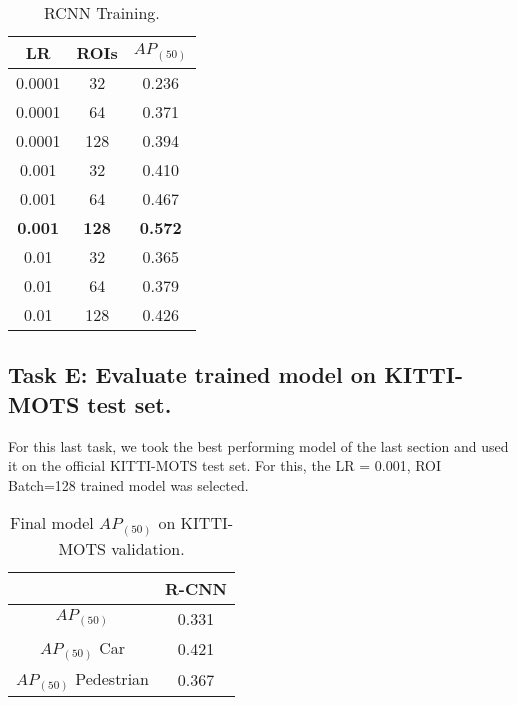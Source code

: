 \documentclass[12pt,a4paper,twocolumn,twoside]{article}
\begin{document}
\begin{table}[ht]
    \centering
    \begin{tabular}{|c | c || c|} 
        \hline
        \textbf{LR} & \textbf{ROIs} & \textbf{$AP_{(50)}$} \\ [0.8ex] 
            \hline
            0.0001 & 32 & 0.236 \\ 
            \hline
            0.0001 & 64 & 0.371\\ 
            \hline
            0.0001 & 128 & 0.394 \\ 
            \hline
            0.001 & 32 & 0.410\\ 
            \hline
            0.001 & 64 & 0.467\\ 
            \hline
            \textbf{0.001} & \textbf{128} & \textbf{0.572}\\ 
            \hline
            0.01 & 32 & 0.365\\ 
            \hline
            0.01 & 64 & 0.379\\ 
            \hline
            0.01 & 128 & 0.426\\ 
         \hline
    \end{tabular}
    \caption{\label{table:RCNN_Table_training}RCNN Training.}
\end{table}

\subsection{Task E: Evaluate trained model on KITTI-MOTS test set.}

For this last task, we took the best performing model of the last section and used
it on the official KITTI-MOTS test set. For this, the LR = 0.001, ROI Batch=128 
trained model was selected. 


\begin{table}[ht]
    \centering
    \begin{tabular}{|c || c |} 
        \hline
          & \textbf{R-CNN}\\ [0.8ex] 
          \hline
         $AP_{(50)}$ & 0.331\\ 
         \hline
         $AP_{(50)}$ Car & 0.421\\
         \hline
         $AP_{(50)}$ Pedestrian & 0.367\\
         \hline
    \end{tabular}
    \caption{\label{table:KITTI-MOTS-FINAL}Final model $AP_{(50)}$ on KITTI-MOTS validation.}
\end{table}
\end{document}
